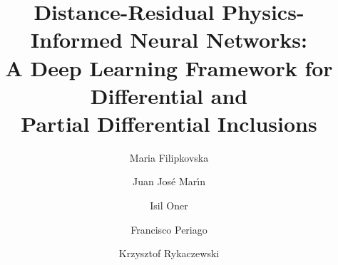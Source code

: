 \documentclass[11pt]{elsarticle}
\theoremstyle{definition}
\theoremstyle{remark}
\numberwithin{equation}{section}
\begin{document}
	
	\begin{frontmatter}
		
		\title{Distance-Residual Physics-Informed Neural Networks:\\
			A Deep Learning Framework for Differential and\\
			Partial Differential Inclusions}
		
		\author[verkin]{Maria Filipkovska}
		\author[upct]{Juan Jos\'e Mar\'{\i}n}
		\author[itu]{Isil Oner}
		\author[upct]{Francisco Periago}
		\author[coper]{Krzysztof Rykaczewski}
		
		
		\address[verkin]{B.\,Verkin Institute for Low Temperature Physics and Engineering of the National Academy of Sciences of Ukraine,
			Kharkiv 61103, Ukraine.}
		
		\address[upct]{Department of Applied Mathematics and Statistics,
			Universidad Polit\'ecnica de Cartagena, member of the European University of Technology EUT+,
			Campus Muralla del Mar, 30202 Cartagena, Murcia, Spain.}
		
		\address[itu]{Department of Mathematics, Faculty of Sciences,
			Gebze Technical University, Kocaeli 41400, Turkey.}
		
		\address[coper]{Faculty of Mathematics and Computer Science, Nicolaus Copernicus University, Chopina 12/18, 87-100
			Torun, Poland}
		

\end{frontmatter}
\end{document}
